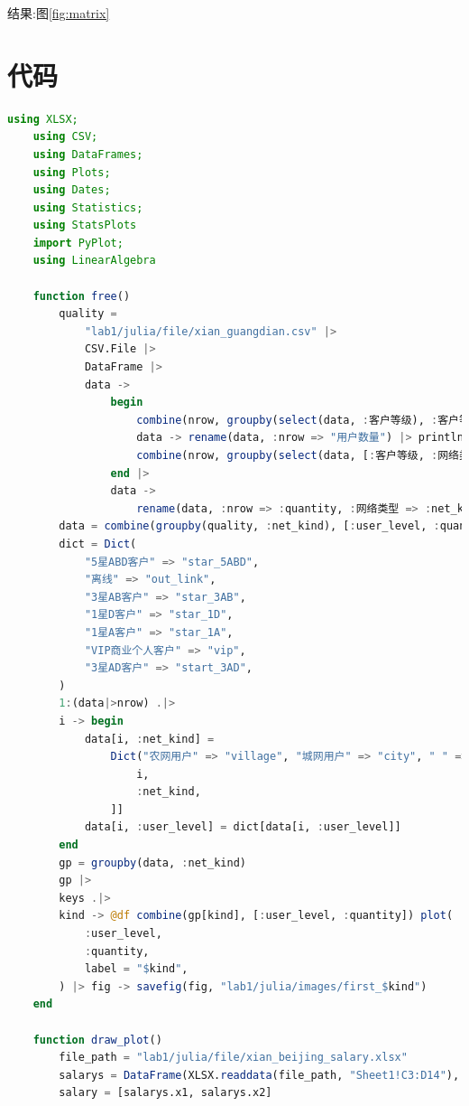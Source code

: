 \documentclass[a4paper]{article}
\begin{document}
结果:图\ref{fig:matrix}

\newpage

\appendix
\section{代码}

\begin{lstlisting}[language=julia]
    using XLSX;
    using CSV;
    using DataFrames;
    using Plots;
    using Dates;
    using Statistics;
    using StatsPlots
    import PyPlot;
    using LinearAlgebra
    
    function free()
        quality =
            "lab1/julia/file/xian_guangdian.csv" |>
            CSV.File |>
            DataFrame |>
            data ->
                begin
                    combine(nrow, groupby(select(data, :客户等级), :客户等级)) |>
                    data -> rename(data, :nrow => "用户数量") |> println
                    combine(nrow, groupby(select(data, [:客户等级, :网络类型]), [:客户等级, :网络类型]))
                end |>
                data ->
                    rename(data, :nrow => :quantity, :网络类型 => :net_kind, :客户等级 => :user_level)
        data = combine(groupby(quality, :net_kind), [:user_level, :quantity])
        dict = Dict(
            "5星ABD客户" => "star_5ABD",
            "离线" => "out_link",
            "3星AB客户" => "star_3AB",
            "1星D客户" => "star_1D",
            "1星A客户" => "star_1A",
            "VIP商业个人客户" => "vip",
            "3星AD客户" => "start_3AD",
        )
        1:(data|>nrow) .|>
        i -> begin
            data[i, :net_kind] =
                Dict("农网用户" => "village", "城网用户" => "city", " " => "unknown")[data[
                    i,
                    :net_kind,
                ]]
            data[i, :user_level] = dict[data[i, :user_level]]
        end
        gp = groupby(data, :net_kind)
        gp |>
        keys .|>
        kind -> @df combine(gp[kind], [:user_level, :quantity]) plot(
            :user_level,
            :quantity,
            label = "$kind",
        ) |> fig -> savefig(fig, "lab1/julia/images/first_$kind")
    end
    
    function draw_plot()
        file_path = "lab1/julia/file/xian_beijing_salary.xlsx"
        salarys = DataFrame(XLSX.readdata(file_path, "Sheet1!C3:D14"), :auto) .|> identity
        salary = [salarys.x1, salarys.x2]
    

\end{lstlisting}
\end{document}
